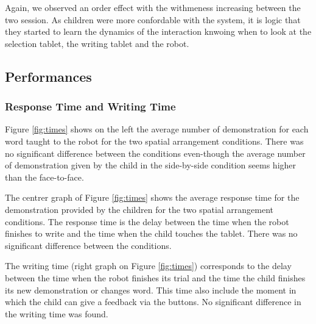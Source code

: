 \documentclass[letterpaper, 10 pt, conference]{ieeeconf}  %
\begin{document}
Again, we observed an order effect with the withmeness increasing between the two session. 
As children were more confordable with the system, it is logic that they started to learn the dynamics of the interaction knwoing when to look at the selection tablet, the writing tablet and the robot. 

\subsection{Performances}
\subsubsection{Response Time and Writing Time}
Figure \ref{fig:times} shows on the left the average number of demonstration for each word taught to the robot for the two spatial arrangement conditions. 
There was no significant difference between the conditions even-though the average number of demonstration given by the child in the side-by-side condition seems higher than the face-to-face.

The centrer graph of Figure \ref{fig:times} shows the average response time for the demonstration provided by the children for the two spatial arrangement conditions.
The response time is the delay between the time when the robot finishes to write and the time when the child touches the tablet.
There was no significant difference between the conditions.
 
The writing time (right graph on Figure \ref{fig:times}) corresponds to the delay between the time when the robot finishes its trial and the time the child finishes its new demonstration or changes word. This time also include the moment in which the child can give a feedback via the buttons.
No significant difference in the writing time was found. 
\end{document}

